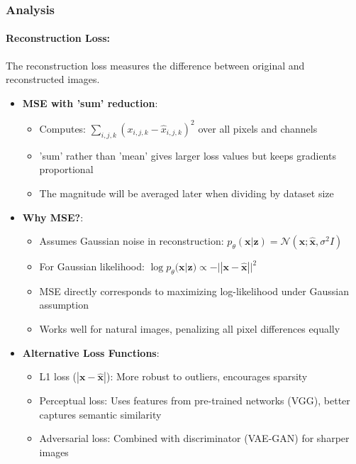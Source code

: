 \documentclass[conference]{IEEEtran}
\begin{document}
\subsubsection{Analysis}

\paragraph{Reconstruction Loss:}

The reconstruction loss measures the difference between original and reconstructed images.

\begin{itemize}
    \item \textbf{MSE with 'sum' reduction}: 
    \begin{itemize}
        \item Computes: $\sum_{i,j,k} (x_{i,j,k} - \hat{x}_{i,j,k})^2$ over all pixels and channels
        \item 'sum' rather than 'mean' gives larger loss values but keeps gradients proportional
        \item The magnitude will be averaged later when dividing by dataset size
    \end{itemize}
    
    \item \textbf{Why MSE?}:
    \begin{itemize}
        \item Assumes Gaussian noise in reconstruction: $p_\theta(\mathbf{x}|\mathbf{z}) = \mathcal{N}(\mathbf{x}; \hat{\mathbf{x}}, \sigma^2 I)$
        \item For Gaussian likelihood: $\log p_\theta(\mathbf{x}|\mathbf{z}) \propto -||\mathbf{x} - \hat{\mathbf{x}}||^2$
        \item MSE directly corresponds to maximizing log-likelihood under Gaussian assumption
        \item Works well for natural images, penalizing all pixel differences equally
    \end{itemize}
    
    \item \textbf{Alternative Loss Functions}:
    \begin{itemize}
        \item L1 loss ($|\mathbf{x} - \hat{\mathbf{x}}|$): More robust to outliers, encourages sparsity
        \item Perceptual loss: Uses features from pre-trained networks (VGG), better captures semantic similarity
        \item Adversarial loss: Combined with discriminator (VAE-GAN) for sharper images
    \end{itemize}
    

\end{itemize}
\end{document}
